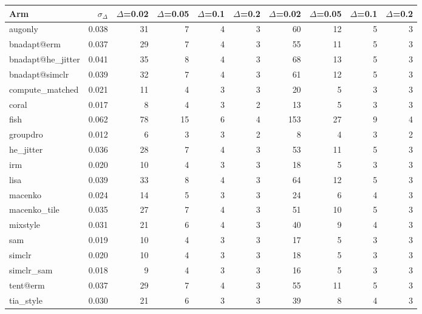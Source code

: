 \begin{tabular}{lrrrrrrrrr}
\toprule
Arm & $\sigma_\Delta$ & $\Delta$=0.02 & $\Delta$=0.05 & $\Delta$=0.1 & $\Delta$=0.2 & $\Delta$=0.02 & $\Delta$=0.05 & $\Delta$=0.1 & $\Delta$=0.2 \\
\midrule
augonly & 0.038 & 31 & 7 & 4 & 3 & 60 & 12 & 5 & 3 \\
bnadapt@erm & 0.037 & 29 & 7 & 4 & 3 & 55 & 11 & 5 & 3 \\
bnadapt@he\_jitter & 0.041 & 35 & 8 & 4 & 3 & 68 & 13 & 5 & 3 \\
bnadapt@simclr & 0.039 & 32 & 7 & 4 & 3 & 61 & 12 & 5 & 3 \\
compute\_matched & 0.021 & 11 & 4 & 3 & 3 & 20 & 5 & 3 & 3 \\
coral & 0.017 & 8 & 4 & 3 & 2 & 13 & 5 & 3 & 3 \\
fish & 0.062 & 78 & 15 & 6 & 4 & 153 & 27 & 9 & 4 \\
groupdro & 0.012 & 6 & 3 & 3 & 2 & 8 & 4 & 3 & 2 \\
he\_jitter & 0.036 & 28 & 7 & 4 & 3 & 53 & 11 & 5 & 3 \\
irm & 0.020 & 10 & 4 & 3 & 3 & 18 & 5 & 3 & 3 \\
lisa & 0.039 & 33 & 8 & 4 & 3 & 64 & 12 & 5 & 3 \\
macenko & 0.024 & 14 & 5 & 3 & 3 & 24 & 6 & 4 & 3 \\
macenko\_tile & 0.035 & 27 & 7 & 4 & 3 & 51 & 10 & 5 & 3 \\
mixstyle & 0.031 & 21 & 6 & 4 & 3 & 40 & 9 & 4 & 3 \\
sam & 0.019 & 10 & 4 & 3 & 3 & 17 & 5 & 3 & 3 \\
simclr & 0.020 & 10 & 4 & 3 & 3 & 18 & 5 & 3 & 3 \\
simclr\_sam & 0.018 & 9 & 4 & 3 & 3 & 16 & 5 & 3 & 3 \\
tent@erm & 0.037 & 29 & 7 & 4 & 3 & 55 & 11 & 5 & 3 \\
tia\_style & 0.030 & 21 & 6 & 3 & 3 & 39 & 8 & 4 & 3 \\
\bottomrule
\end{tabular}
